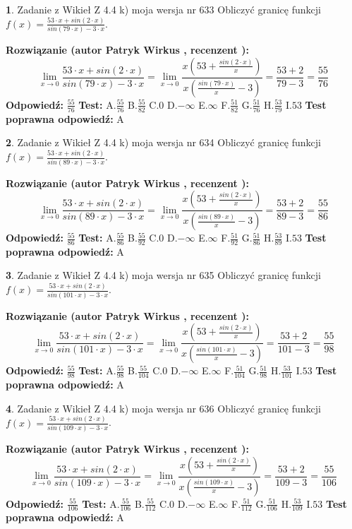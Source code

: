 \documentclass[12pt, a4paper]{article}
\theoremstyle{definition} %
\newtheorem{zad}{}
\newcommand{\zadStart}[1]{\begin{zad}#1\newline}
\newcommand{\zadStop}{\end{zad}}
\newcommand{\rozwStart}[2]{\noindent \textbf{Rozwiązanie (autor #1 , recenzent #2): }\newline}
\newcommand{\rozwStop}{\newline}
\newcommand{\odpStart}{\noindent \textbf{Odpowiedź:}\newline}
\newcommand{\odpStop}{\newline}
\newcommand{\testStart}{\noindent \textbf{Test:}\newline}
\newcommand{\testStop}{\newline}
\newcommand{\kluczStart}{\noindent \textbf{Test poprawna odpowiedź:}\newline}
\newcommand{\kluczStop}{\newline}
\begin{document}
\zadStart{Zadanie z Wikieł Z 4.4 k) moja wersja nr 633}
Obliczyć granicę funkcji $f(x)=\frac{53\cdot x +sin(2\cdot x)}{sin(79\cdot x) -3\cdot x}$.
\zadStop
\rozwStart{Patryk Wirkus}{}
$$\lim\limits_{x\to 0}\frac{53\cdot x +sin(2\cdot x)}{sin(79\cdot x) -3\cdot x}
=\lim\limits_{x\to 0}\frac{x(53+\frac{sin(2\cdot x)}{x})}{x(\frac{sin(79\cdot x)}{x}-3)}
=\frac{53+2}{79-3} = \frac{55}{76}$$
\rozwStop
\odpStart
$\frac{55}{76}$
\odpStop
\testStart
A.$\frac{55}{76}$
B.$\frac{55}{82}$
C.$0$
D.$-\infty$
E.$\infty$
F.$\frac{51}{82}$
G.$\frac{51}{76}$
H.$\frac{53}{79}$
I.$53$
\testStop
\kluczStart
A
\kluczStop



\zadStart{Zadanie z Wikieł Z 4.4 k) moja wersja nr 634}
Obliczyć granicę funkcji $f(x)=\frac{53\cdot x +sin(2\cdot x)}{sin(89\cdot x) -3\cdot x}$.
\zadStop
\rozwStart{Patryk Wirkus}{}
$$\lim\limits_{x\to 0}\frac{53\cdot x +sin(2\cdot x)}{sin(89\cdot x) -3\cdot x}
=\lim\limits_{x\to 0}\frac{x(53+\frac{sin(2\cdot x)}{x})}{x(\frac{sin(89\cdot x)}{x}-3)}
=\frac{53+2}{89-3} = \frac{55}{86}$$
\rozwStop
\odpStart
$\frac{55}{86}$
\odpStop
\testStart
A.$\frac{55}{86}$
B.$\frac{55}{92}$
C.$0$
D.$-\infty$
E.$\infty$
F.$\frac{51}{92}$
G.$\frac{51}{86}$
H.$\frac{53}{89}$
I.$53$
\testStop
\kluczStart
A
\kluczStop



\zadStart{Zadanie z Wikieł Z 4.4 k) moja wersja nr 635}
Obliczyć granicę funkcji $f(x)=\frac{53\cdot x +sin(2\cdot x)}{sin(101\cdot x) -3\cdot x}$.
\zadStop
\rozwStart{Patryk Wirkus}{}
$$\lim\limits_{x\to 0}\frac{53\cdot x +sin(2\cdot x)}{sin(101\cdot x) -3\cdot x}
=\lim\limits_{x\to 0}\frac{x(53+\frac{sin(2\cdot x)}{x})}{x(\frac{sin(101\cdot x)}{x}-3)}
=\frac{53+2}{101-3} = \frac{55}{98}$$
\rozwStop
\odpStart
$\frac{55}{98}$
\odpStop
\testStart
A.$\frac{55}{98}$
B.$\frac{55}{104}$
C.$0$
D.$-\infty$
E.$\infty$
F.$\frac{51}{104}$
G.$\frac{51}{98}$
H.$\frac{53}{101}$
I.$53$
\testStop
\kluczStart
A
\kluczStop



\zadStart{Zadanie z Wikieł Z 4.4 k) moja wersja nr 636}
Obliczyć granicę funkcji $f(x)=\frac{53\cdot x +sin(2\cdot x)}{sin(109\cdot x) -3\cdot x}$.
\zadStop
\rozwStart{Patryk Wirkus}{}
$$\lim\limits_{x\to 0}\frac{53\cdot x +sin(2\cdot x)}{sin(109\cdot x) -3\cdot x}
=\lim\limits_{x\to 0}\frac{x(53+\frac{sin(2\cdot x)}{x})}{x(\frac{sin(109\cdot x)}{x}-3)}
=\frac{53+2}{109-3} = \frac{55}{106}$$
\rozwStop
\odpStart
$\frac{55}{106}$
\odpStop
\testStart
A.$\frac{55}{106}$
B.$\frac{55}{112}$
C.$0$
D.$-\infty$
E.$\infty$
F.$\frac{51}{112}$
G.$\frac{51}{106}$
H.$\frac{53}{109}$
I.$53$
\testStop
\kluczStart
A
\kluczStop
\end{document}
